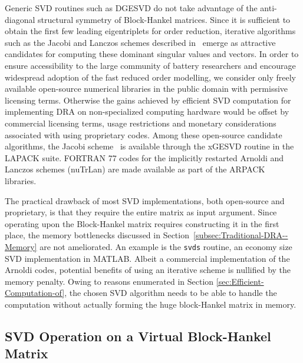 Generic SVD routines such as DGESVD do not take advantage of the anti-diagonal
structural symmetry of Block-Hankel matrices. Since it is sufficient
to obtain the first few leading eigentriplets for order reduction,
iterative algorithms such as the Jacobi and Lanczos schemes described
in~\citep{GolubVanLoan2012} emerge as attractive candidates for
computing these dominant singular values and vectors. In order to
ensure accessibility to the large community of battery researchers
and encourage widespread adoption of the fast reduced order modelling,
we consider only freely available open-source numerical libraries
in the public domain with permissive licensing terms. Otherwise the
gains achieved by efficient SVD computation for implementing DRA on
non-specialized computing hardware would be offset by commercial licensing
terms, usage restrictions and monetary considerations associated with
using proprietary codes. Among these open-source candidate algorithms,
the Jacobi scheme~\citep{GolubVanLoan2012} is available through
the xGESVD routine in the LAPACK suite. FORTRAN 77 codes for the implicitly
restarted Arnoldi and Lanczos schemes (nuTrLan) are made available
as part of the ARPACK~\citep{LehoucqMaschhoffSorensenEtAl2013} libraries.

The practical drawback of most SVD implementations, both open-source
and proprietary, is that they require the entire matrix as input argument.
Since operating upon the Block-Hankel matrix requires constructing
it in the first place, the memory bottlenecks discussed in Section~\ref{subsec:Traditional-DRA--Memory}
are not ameliorated. An example is the \texttt{svds} routine, an economy
size SVD implementation in MATLAB. Albeit a commercial implementation
of the Arnoldi codes, potential benefits of using an iterative scheme
is nullified by the memory penalty. Owing to reasons enumerated in
Section \ref{sec:Efficient-Computation-of}, the chosen SVD algorithm
needs to be able to handle the computation without actually forming
the huge block-Hankel matrix in memory.

\subsection{SVD Operation on a Virtual Block-Hankel Matrix}

